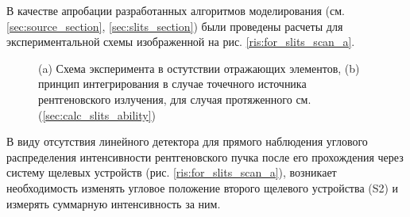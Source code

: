 В качестве апробации разработанных алгоритмов моделирования (см. \ref{sec:source_section}, \ref{sec:slits_section})
были проведены расчеты для экспериментальной схемы изображенной на рис. \ref{ris:for_slits_scan_a}.

\begin{figure}[H]
  \centering
  \hfill
  \caption{ (a) Схема эксперимента в остутствии отражающих элементов, (b) принцип интегрирования в
  случае точечного источника рентгеновского излучения, для случая протяженного см. (\ref{sec:calc_slits_ability})}
  \label{ris:for_slits_scan}

\end{figure}
В виду отсутствия линейного детектора для прямого наблюдения углового распределения интенсивности рентгеновского
пучка после его прохождения через систему щелевых устройств (рис. \ref{ris:for_slits_scan_a}),
возникает необходимость изменять угловое положение второго щелевого устройства (S2) и измерять суммарную интенсивность
за ним.

